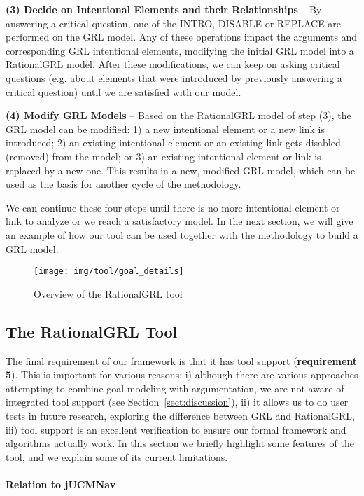 \textbf{(3) Decide on Intentional Elements and their Relationships} -- By answering a critical question, one of the \textsf{INTRO}, \textsf{DISABLE} or \textsf{REPLACE} are performed on the GRL model. Any of these operations impact the arguments and corresponding GRL intentional elements, modifying the initial GRL model into a RationalGRL model. After these modifications, we can keep on asking critical questions (e.g. about elements that were introduced by previously answering a critical question) until we are satisfied with our model.   

\textbf{(4) Modify GRL Models} -- Based on the RationalGRL model of step (3), the GRL model can be modified: 1) a new intentional element or a new link is introduced; 2) an existing intentional element or an existing link gets disabled (removed) from the model; or 3) an existing intentional element or link is replaced by a new one. This results in a new, modified GRL model, which can be used as the basis for another cycle of the methodology. 

We can continue these four steps until there is no more intentional element or link to analyze or we reach a satisfactory model. In the next section, we will give an example of how our tool can be used together with the methodology to build a GRL model.  

\begin{figure*}[t]
\centering
\texttt{[image: img/tool/goal\_details]}
\caption{Overview of the RationalGRL tool}
\label{fig:tool:overview}
\end{figure*}


\subsection{The RationalGRL Tool}
\label{sect:tool}

The final requirement of our framework is that it has tool support (\textbf{requirement 5}). This is important for various reasons: i) although there are various approaches attempting to combine goal modeling with argumentation, we are not aware of integrated tool support (see Section~\ref{sect:discussion}), ii) it allows us to do user tests in future research, exploring the difference between GRL and RationalGRL, iii) tool support is an excellent verification to ensure our formal framework and algorithms actually work. In this section we briefly highlight some features of the tool, and we explain some of its current limitations.

\paragraph{Relation to jUCMNav} 

